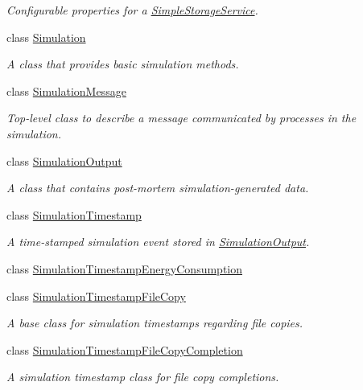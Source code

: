 \begin{DoxyCompactItemize}
\begin{DoxyCompactList}\small\item\em Configurable properties for a \hyperlink{classwrench_1_1_simple_storage_service}{Simple\+Storage\+Service}. \end{DoxyCompactList}\item 
class \hyperlink{classwrench_1_1_simulation}{Simulation}
\begin{DoxyCompactList}\small\item\em A class that provides basic simulation methods. \end{DoxyCompactList}\item 
class \hyperlink{classwrench_1_1_simulation_message}{Simulation\+Message}
\begin{DoxyCompactList}\small\item\em Top-\/level class to describe a message communicated by processes in the simulation. \end{DoxyCompactList}\item 
class \hyperlink{classwrench_1_1_simulation_output}{Simulation\+Output}
\begin{DoxyCompactList}\small\item\em A class that contains post-\/mortem simulation-\/generated data. \end{DoxyCompactList}\item 
class \hyperlink{classwrench_1_1_simulation_timestamp}{Simulation\+Timestamp}
\begin{DoxyCompactList}\small\item\em A time-\/stamped simulation event stored in \hyperlink{classwrench_1_1_simulation_output}{Simulation\+Output}. \end{DoxyCompactList}\item 
class \hyperlink{classwrench_1_1_simulation_timestamp_energy_consumption}{Simulation\+Timestamp\+Energy\+Consumption}
\item 
class \hyperlink{classwrench_1_1_simulation_timestamp_file_copy}{Simulation\+Timestamp\+File\+Copy}
\begin{DoxyCompactList}\small\item\em A base class for simulation timestamps regarding file copies. \end{DoxyCompactList}\item 
class \hyperlink{classwrench_1_1_simulation_timestamp_file_copy_completion}{Simulation\+Timestamp\+File\+Copy\+Completion}
\begin{DoxyCompactList}\small\item\em A simulation timestamp class for file copy completions. \end{DoxyCompactList}\item 

\end{DoxyCompactItemize}
